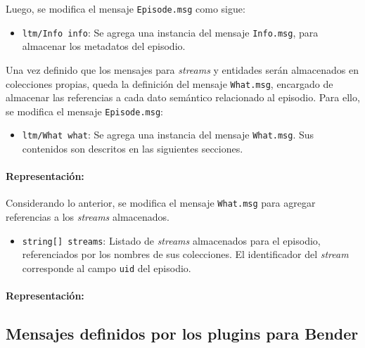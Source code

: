 Luego, se modifica el mensaje \texttt{Episode.msg} como sigue:
\begin{itemize}
	\item \texttt{ltm/Info info}: Se agrega una instancia del mensaje \texttt{Info.msg}, para almacenar los metadatos del episodio.
\end{itemize}

Una vez definido que los mensajes para \textit{streams} y entidades serán almacenados en colecciones propias, queda la definición del mensaje \texttt{What.msg}, encargado de almacenar las referencias a cada dato semántico relacionado al episodio. Para ello, se modifica el mensaje \texttt{Episode.msg}:
\begin{itemize}
	\item \texttt{ltm/What what}: Se agrega una instancia del mensaje \texttt{What.msg}. Sus contenidos son descritos en las siguientes secciones.
\end{itemize}


\paragraph{Representación:}
Considerando lo anterior, se modifica el mensaje \texttt{What.msg} para agregar referencias a los \textit{streams} almacenados.
\begin{itemize}
	\item \texttt{string[] streams}: Listado de \textit{streams} almacenados para el episodio,  referenciados por los nombres de sus colecciones. El identificador del \textit{stream} corresponde al campo \texttt{uid} del episodio.
\end{itemize}

\paragraph{Representación:}




\lstset{style=/Style/ROS/MSG}


\subsection{Mensajes definidos por los plugins para Bender}

